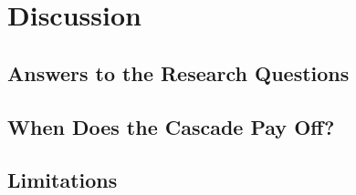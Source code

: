 \chapter{Discussion}\label{ch:discussion}

\section{Answers to the Research Questions}
\section{When Does the Cascade Pay Off?}
\section{Limitations}

